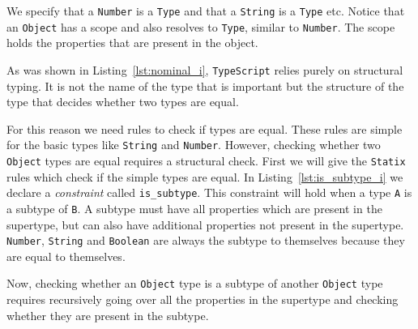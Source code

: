 \documentclass{article}
\newcommand{\ttt}[1]{\texttt{#1}}
\begin{document}
\begin{center}
    \begin{minipage}{.35\textwidth}
    
    \end{minipage}
\end{center}
We specify that a \ttt{Number} is a \ttt{Type} and that a \ttt{String} is a \ttt{Type} etc.
Notice that an \ttt{Object} has a scope and also resolves to \ttt{Type}, similar to \ttt{Number}.
The scope holds the properties that are present in the object.

As was shown in Listing~\ref{lst:nominal_i}, \ttt{TypeScript} relies purely on structural typing.
It is not the name of the type that is important but the structure of the type that decides whether two types are equal.

For this reason we need rules to check if types are equal.
These rules are simple for the basic types like \ttt{String} and \ttt{Number}.
However, checking whether two \ttt{Object} types are equal requires a structural check.
First we will give the \ttt{Statix} rules which check if the simple types are equal.
In Listing~\ref{lst:is_subtype_i} we declare a \textit{constraint} called \ttt{is\_subtype}.
This constraint will hold when a type \ttt{A} is a subtype of \ttt{B}.
A subtype must have all properties which are present in the supertype, but can also have additional properties not present in the supertype.
\ttt{Number}, \ttt{String} and \ttt{Boolean} are always the subtype to themselves because they are equal to themselves.

\begin{center}
    \begin{minipage}{.55\textwidth}
    
    \end{minipage}
\end{center}
Now, checking whether an \ttt{Object} type is a subtype of another \ttt{Object} type requires recursively going over all the properties in the supertype and checking whether they are present in the subtype.
\end{document}
